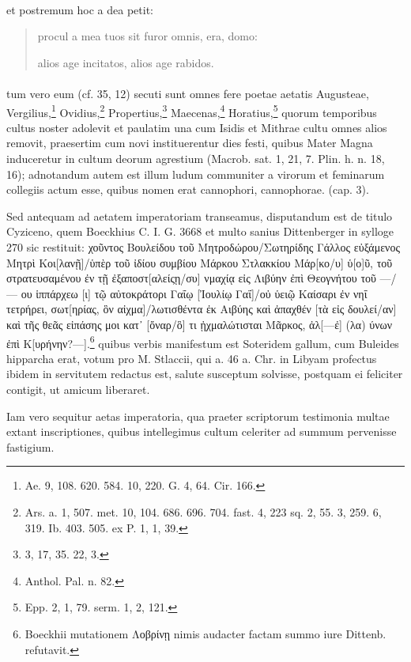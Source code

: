 \documentclass[a4paper, 11pt, oneside, polutonikogreek, german]{article}
\begin{document}
\paragraph{}
et postremum hoc a dea petit:
\begin{quotation}
procul a mea tuos sit furor omnis, era, domo:

alios age incitatos, alios age rabidos.
\end{quotation}
\paragraph{}
tum vero eum (cf. 35, 12) secuti sunt omnes fere poetae aetatis Augusteae, Vergilius,\footnote{Ae. 9, 108. 620. 584. 10, 220. G. 4, 64. Cir. 166.} Ovidius,\footnote{Ars. a. 1, 507. met. 10, 104. 686. 696. 704. fast. 4, 223 sq. 2, 55. 3, 259. 6, 319. Ib. 403. 505. ex P. 1, 1, 39.} Propertius,\footnote{3, 17, 35. 22, 3.} Maecenas,\footnote{Anthol. Pal. n. 82.} Horatius,\footnote{Epp. 2, 1, 79. serm. 1, 2, 121.} quorum temporibus cultus noster adolevit et paulatim una cum Isidis et Mithrae cultu omnes alios removit, praesertim cum novi instituerentur dies festi, quibus Mater Magna induceretur in cultum deorum agrestium (Macrob. sat. 1, 21, 7. Plin. h. n. 18, 16); adnotandum autem est illum ludum communiter a virorum et feminarum collegiis actum esse, quibus nomen erat cannophori, cannophorae. (cap. 3).

Sed antequam ad aetatem imperatoriam transeamus, disputandum est de titulo Cyziceno, quem Boeckhius C. I. G. 3668 et multo sanius Dittenberger in sylloge 270 sic restituit: χοῦντος Βουλείδου τοῦ Μητροδώρου/Σωτηρίδης Γάλλος εὐξάμενος Μητρὶ Κοι[λανῇ]/ὑπὲρ τοῦ ἰδίου συμβίου Μάρκου Στλακκίου Μάρ[κο/υ] ὑ[ο]ῦ, τοῦ στρατευσαμένου ἐν τῇ ἐξαποστ[αλείςῃ/συ] νμαχίᾳ εἰς Λιβύην ἐπὶ Θεογνήτου τοῦ ---/--- ου ἱππάρχεω [ι] τῷ αὐτοκράτορι Γαΐῳ [Ἰουλίῳ Γαΐ]/οὐ ὑειῷ Καίσαρι ἐν νηΐ τετρήρει, σωτ[ηρίας, ὃν αἰχμα]/λωτισθέντα ἐκ Αιβύης καὶ ἀπαχθέν [τὰ εἰς δουλεί/αν] καὶ τῆς θεᾶς εἰπάσης μοι κατ᾽ [ὄναρ/ὃ] τι ᾐχμαλώτισται Μᾶρκος, ἀλ[---ἐ] (λα) ύνων ἐπὶ Κ[υρήνην?---].\footnote{Boeckhii mutationem Λοβρίνῃ nimis audacter factam summo iure Dittenb. refutavit.} quibus verbis manifestum est Soteridem gallum, cum Buleides hipparcha erat, votum pro M. Stlaccii, qui a. 46 a. Chr. in Libyam profectus ibidem in servitutem redactus est, salute susceptum solvisse, postquam ei feliciter contigit, ut amicum liberaret.

Iam vero sequitur aetas imperatoria, qua praeter scriptorum testimonia multae extant inscriptiones, quibus intellegimus cultum celeriter ad summum pervenisse fastigium.
\end{document}
